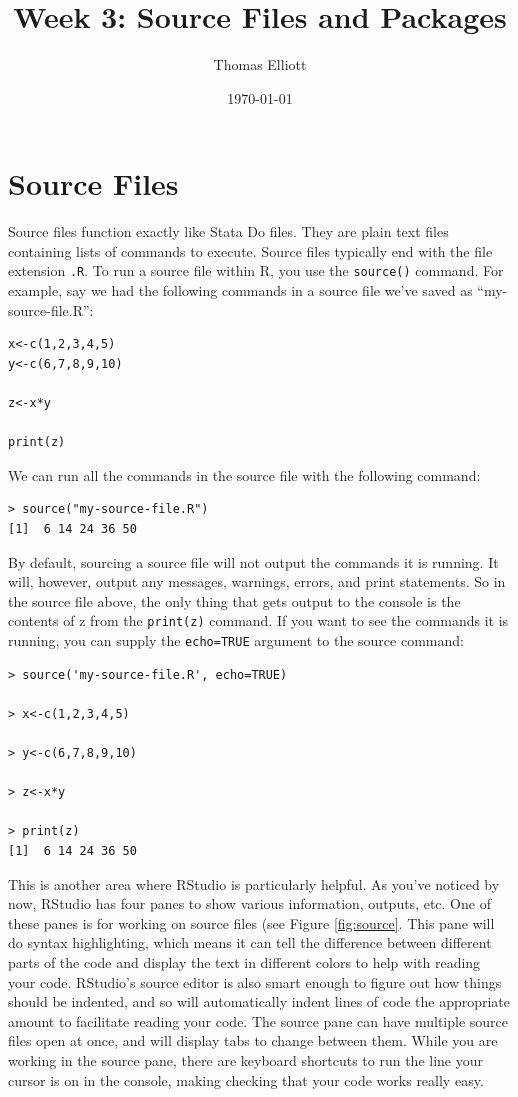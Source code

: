 \documentclass[12pt, oneside]{amsart}   	%
\title{Week 3: Source Files and Packages}
\author{Thomas Elliott}
\date{\today}							%
\begin{document}
\maketitle
\lstset{language=R}

\section{Source Files}

Source files function exactly like Stata Do files. They are plain text files containing lists of commands to execute. Source files typically end with the file extension \texttt{.R}. To run a source file within R, you use the \texttt{source()} command. For example, say we had the following commands in a source file we've saved as ``my-source-file.R'':

\begin{lstlisting}
x<-c(1,2,3,4,5)
y<-c(6,7,8,9,10)

z<-x*y

print(z)
\end{lstlisting}

We can run all the commands in the source file with the following command:

\begin{lstlisting}
> source("my-source-file.R")
[1]  6 14 24 36 50
\end{lstlisting}

By default, sourcing a source file will not output the commands it is running. It will, however, output any messages, warnings, errors, and print statements. So in the source file above, the only thing that gets output to the console is the contents of z from the \texttt{print(z)} command. If you want to see the commands it is running, you can supply the \texttt{echo=TRUE} argument to the source command:

\begin{lstlisting}
> source('my-source-file.R', echo=TRUE)

> x<-c(1,2,3,4,5)

> y<-c(6,7,8,9,10)

> z<-x*y

> print(z)
[1]  6 14 24 36 50
\end{lstlisting}

This is another area where RStudio is particularly helpful. As you've noticed by now, RStudio has four panes to show various information, outputs, etc. One of these panes is for working on source files (see Figure \ref{fig:source}. This pane will do syntax highlighting, which means it can tell the difference between different parts of the code and display the text in different colors to help with reading your code. RStudio's source editor is also smart enough to figure out how things should be indented, and so will automatically indent lines of code the appropriate amount to facilitate reading your code. The source pane can have multiple source files open at once, and will display tabs to change between them. While you are working in the source pane, there are keyboard shortcuts to run the line your cursor is on in the console, making checking that your code works really easy. 
\end{document}
